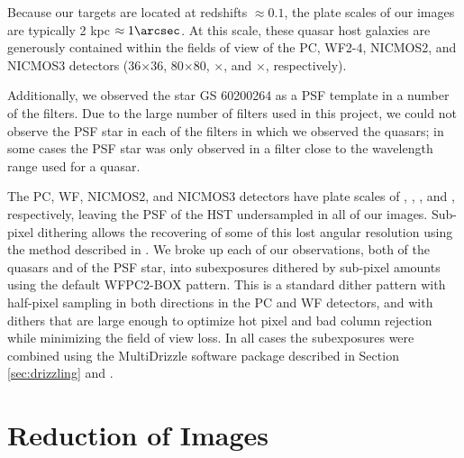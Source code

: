 Because our targets are located at redshifts $\approx 0.1$, the plate scales of our images are typically 2 kpc $\approx 1\arcsec$.  At this scale, these quasar host galaxies are generously contained within the fields of view of the PC, WF2-4, NICMOS2, and NICMOS3 detectors (36\arcsec$\times$36\arcsec, 80\arcsec$\times$80\arcsec, $\times$, and $\times$, respectively).



Additionally, we observed the star GS 60200264 as a PSF template in a number of the filters. Due to the large number of filters used in this project, we could not observe the PSF star in each of the filters in which we observed the quasars; in some cases the PSF star was only observed in a filter close to the wavelength range used for a quasar.

The PC, WF, NICMOS2, and NICMOS3 detectors have plate scales of , , , and , respectively, leaving the PSF of the HST undersampled in all of our images. Sub-pixel dithering allows the recovering of some of this lost angular resolution using the method described in \citep{FruchterDrizzle,KoekemoerMultidrizzle}. We broke up each of our observations, both of the quasars and of the PSF star, into subexposures dithered by sub-pixel amounts using the default WFPC2-BOX pattern. This is a standard dither pattern with half-pixel sampling in both directions in the PC and WF detectors, and with dithers that are large enough to optimize hot pixel and bad column rejection while minimizing the field of view loss. In all cases the subexposures were combined using the MultiDrizzle software package described in Section \ref{sec:drizzling} and \citep{FruchterDrizzle,KoekemoerMultidrizzle}.


\section{Reduction of Images}
\label{sec:reduction}


